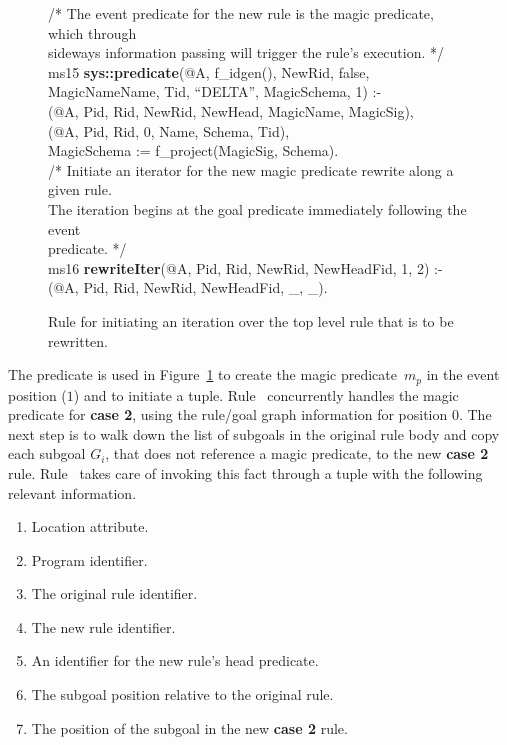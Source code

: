 \begin{figure}[!t]
\ssp
\centering
\begin{boxedminipage}{\linewidth}
/* The event predicate for the new rule is the magic predicate, which through \\
sideways information passing will trigger the rule's execution. */ \\ 
ms15 {\bf sys::predicate}(@A, f\_idgen(), NewRid, false, MagicNameName, Tid, ``DELTA'', MagicSchema, 1) :- \\
(@A, Pid, Rid, NewRid, NewHead, MagicName, MagicSig), \\
(@A, Pid, Rid, 0, Name, Schema, Tid), \\
\datalogspace MagicSchema := f\_project(MagicSig, Schema).\\

/* Initiate an iterator for the new magic predicate rewrite along a given rule.  \\
The iteration begins at the goal predicate immediately following the event \\
predicate. */ \\
ms16 {\bf rewriteIter}(@A, Pid, Rid, NewRid, NewHeadFid, 1, 2) :- \\
(@A, Pid, Rid, NewRid, NewHeadFid, \_, \_). \\

\end{boxedminipage}
\caption{\label{ch:magic:fig:rewrite2} Rule for initiating an iteration over the
top level rule that is to be rewritten. }
\end{figure}

The  predicate is used in Figure~\ref{ch:magic:fig:rewrite2} to
create the magic predicate~$m_p$ in the event position ($1$) and to initiate a
 tuple.  Rule~ concurrently handles the magic
predicate for {\bf case 2}, using the rule/goal graph information for 
position $0$.  The next step is to walk down the list of subgoals in the
original rule body and copy each subgoal $G_{i}$, that does not reference a
magic predicate, to the new {\bf case 2} rule.  Rule~ takes care of
invoking this fact through a  tuple with the following relevant
information.  
\begin{enumerate} 
  \ssp
  \item Location attribute.  
  \item Program identifier.
  \item The original rule identifier.
  \item The new rule identifier.
  \item An identifier for the new rule's head predicate.
  \item The subgoal position relative to the original rule.
  \item The position of the subgoal in the new {\bf case 2} rule.
\end{enumerate}

